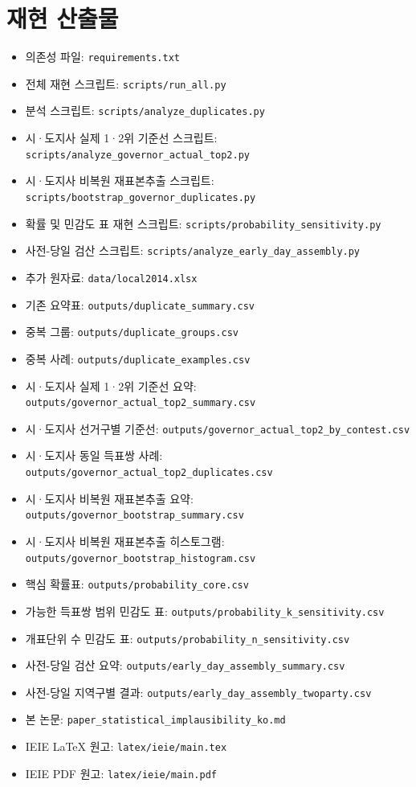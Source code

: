 \documentclass[preprint]{IEIE}
\begin{document}
\section*{재현 산출물}

\begin{itemize}
\item 의존성 파일: \texttt{requirements.txt}
\item 전체 재현 스크립트: \texttt{scripts/run\_all.py}
\item 분석 스크립트: \texttt{scripts/analyze\_duplicates.py}
\item 시·도지사 실제 1·2위 기준선 스크립트: \texttt{scripts/analyze\_governor\_actual\_top2.py}
\item 시·도지사 비복원 재표본추출 스크립트: \texttt{scripts/bootstrap\_governor\_duplicates.py}
\item 확률 및 민감도 표 재현 스크립트: \texttt{scripts/probability\_sensitivity.py}
\item 사전-당일 검산 스크립트: \texttt{scripts/analyze\_early\_day\_assembly.py}
\item 추가 원자료: \texttt{data/local2014.xlsx}
\item 기존 요약표: \texttt{outputs/duplicate\_summary.csv}
\item 중복 그룹: \texttt{outputs/duplicate\_groups.csv}
\item 중복 사례: \texttt{outputs/duplicate\_examples.csv}
\item 시·도지사 실제 1·2위 기준선 요약: \texttt{outputs/governor\_actual\_top2\_summary.csv}
\item 시·도지사 선거구별 기준선: \texttt{outputs/governor\_actual\_top2\_by\_contest.csv}
\item 시·도지사 동일 득표쌍 사례: \texttt{outputs/governor\_actual\_top2\_duplicates.csv}
\item 시·도지사 비복원 재표본추출 요약: \texttt{outputs/governor\_bootstrap\_summary.csv}
\item 시·도지사 비복원 재표본추출 히스토그램: \texttt{outputs/governor\_bootstrap\_histogram.csv}
\item 핵심 확률표: \texttt{outputs/probability\_core.csv}
\item 가능한 득표쌍 범위 민감도 표: \texttt{outputs/probability\_k\_sensitivity.csv}
\item 개표단위 수 민감도 표: \texttt{outputs/probability\_n\_sensitivity.csv}
\item 사전-당일 검산 요약: \texttt{outputs/early\_day\_assembly\_summary.csv}
\item 사전-당일 지역구별 결과: \texttt{outputs/early\_day\_assembly\_twoparty.csv}
\item 본 논문: \texttt{paper\_statistical\_implausibility\_ko.md}
\item IEIE LaTeX 원고: \texttt{latex/ieie/main.tex}
\item IEIE PDF 원고: \texttt{latex/ieie/main.pdf}
\end{itemize}
\end{document}
